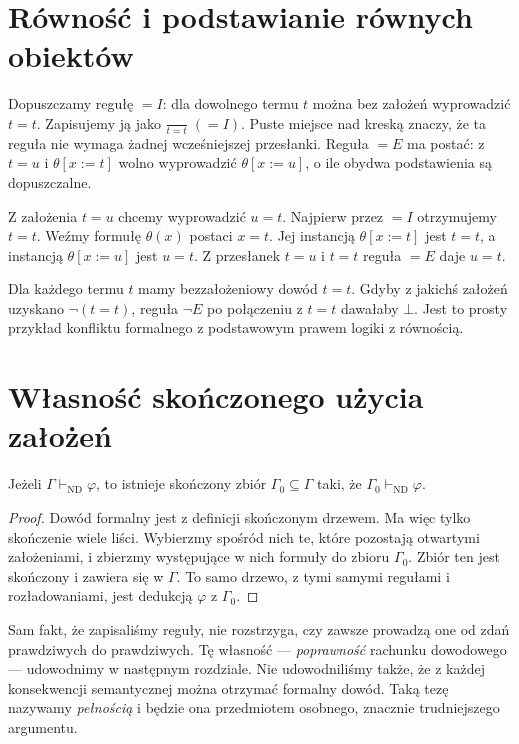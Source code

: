\section{Równość i podstawianie równych obiektów}
\begin{definicja}\label{def:nd-equality}
Dopuszczamy regułę $=I$: dla dowolnego termu $t$
można bez założeń wyprowadzić $t=t$. Zapisujemy ją jako
$\frac{}{t=t}\;(=I)$. Puste miejsce nad kreską znaczy,
że ta reguła nie wymaga żadnej wcześniejszej przesłanki.
Reguła $=E$ ma postać: z $t=u$ i
$\theta[x:=t]$ wolno wyprowadzić $\theta[x:=u]$,
o ile obydwa podstawienia są dopuszczalne.
\end{definicja}
\begin{przyklad}
Z założenia $t=u$ chcemy wyprowadzić $u=t$.
Najpierw przez $=I$ otrzymujemy $t=t$.
Weźmy formułę $\theta(x)$ postaci $x=t$.
Jej instancją $\theta[x:=t]$ jest $t=t$,
a instancją $\theta[x:=u]$ jest $u=t$.
Z przesłanek $t=u$ i $t=t$ reguła $=E$ daje $u=t$.
\end{przyklad}
\begin{przyklad}
Dla każdego termu $t$ mamy bezzałożeniowy dowód $t=t$.
Gdyby z jakichś założeń uzyskano $\neg(t=t)$,
reguła $\neg E$ po połączeniu z $t=t$ dawałaby $\bot$.
Jest to prosty przykład konfliktu formalnego z podstawowym
prawem logiki z równością.
\end{przyklad}

\section{Własność skończonego użycia założeń}
\begin{twierdzenie}
\label{thm:nd-finite-support}
Jeżeli $\Gamma\vdash_{\mathrm{ND}}\varphi$, to istnieje
skończony zbiór $\Gamma_0\subseteq\Gamma$ taki, że
$\Gamma_0\vdash_{\mathrm{ND}}\varphi$.
\end{twierdzenie}
\begin{proof}
Dowód formalny jest z definicji skończonym drzewem.
Ma więc tylko skończenie wiele liści. Wybierzmy spośród
nich te, które pozostają otwartymi założeniami, i zbierzmy
występujące w nich formuły do zbioru $\Gamma_0$.
Zbiór ten jest skończony i zawiera się w $\Gamma$.
To samo drzewo, z tymi samymi regułami i rozładowaniami,
jest dedukcją $\varphi$ z $\Gamma_0$.
\end{proof}

\begin{uwaga}
Sam fakt, że zapisaliśmy reguły, nie rozstrzyga,
czy zawsze prowadzą one od zdań prawdziwych do prawdziwych.
Tę własność — \emph{poprawność} rachunku dowodowego —
udowodnimy w następnym rozdziale.
Nie udowodniliśmy także, że z każdej konsekwencji
semantycznej można otrzymać formalny dowód.
Taką tezę nazywamy \emph{pełnością} i będzie ona przedmiotem
osobnego, znacznie trudniejszego argumentu.
\end{uwaga}